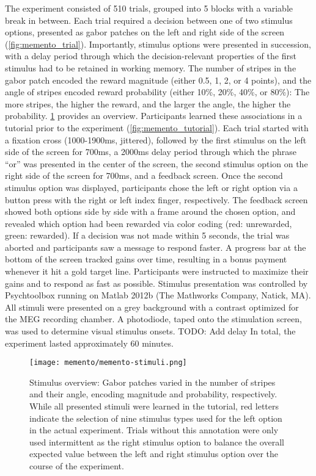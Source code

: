 The experiment consisted of 510 trials, grouped into 5 blocks with a variable break in between.
Each trial required a decision between one of two stimulus options, presented as gabor patches on the left and right side of the screen (\cref{fig:memento_trial}).
Importantly, stimulus options were presented in succession, with a delay period through which the decision-relevant properties of the first stimulus had to be retained in working memory.
The number of stripes in the gabor patch encoded the reward magnitude (either 0.5, 1, 2, or 4 points), and the angle of stripes encoded reward probability (either 10\%, 20\%, 40\%, or 80\%): The more stripes, the higher the reward, and the larger the angle, the higher the probability.
\cref{fig:memento_stim} provides an overview.
Participants learned these associations in a tutorial prior to the experiment (\cref{fig:memento_tutorial}).
Each trial started with a fixation cross (1000-1900ms, jittered), followed by the first stimulus on the left side of the screen for 700ms, a 2000ms delay period through which the phrase ``or'' was presented in the center of the screen, the second stimulus option on the right side of the screen for 700ms, and a feedback screen.
Once the second stimulus option was displayed, participants chose the left or right option via a button press with the right or left index finger, respectively.
The feedback screen showed both options side by side with a frame around the chosen option, and revealed which option had been rewarded via color coding (red: unrewarded, green: rewarded).
If a decision was not made within 5 seconds, the trial was aborted and participants saw a message to respond faster.
A progress bar at the bottom of the screen tracked gains over time, resulting in a bonus payment whenever it hit a gold target line.
Participants were instructed to maximize their gains and to respond as fast as possible.
Stimulus presentation was controlled by Psychtoolbox \citep{kleiner2007s} running on Matlab 2012b (The Mathworks Company, Natick, MA).
All stimuli were presented on a grey background with a contrast optimized for the MEG recording chamber.
A photodiode, taped onto the stimulation screen, was used to determine visual stimulus onsets.
TODO: Add delay
In total, the experiment lasted approximately 60 minutes.

\begin{figure}
	\centering
	\texttt{[image: memento/memento-stimuli.png]}
	\caption[Stimulus overview]{Stimulus overview: Gabor patches varied in the number of stripes and their angle, encoding magnitude and probability, respectively. While all presented stimuli were learned in the tutorial, red letters indicate the selection of nine stimulus types used for the left option in the actual experiment. Trials without this annotation were only used intermittent as the right stimulus option to balance the overall expected value between the left and right stimulus option over the course of the experiment.}
	\label{fig:memento_stim}
\end{figure}

